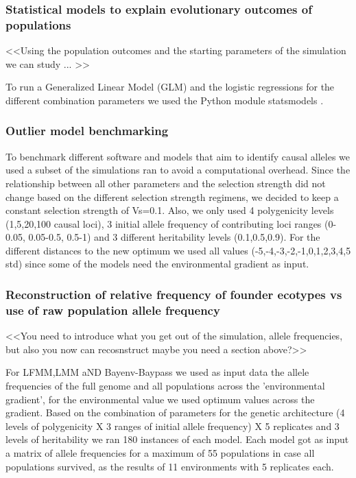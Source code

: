 \documentclass{article}
\begin{document}
\subsubsection{Statistical models to explain evolutionary outcomes of populations}

<<Using the population outcomes and the starting parameters of the simulation we can study ... >>

To run a Generalized Linear Model (GLM) and the logistic regressions for the different combination parameters we used the Python module statsmodels \citep{Seabold2010-ec}. 


\subsubsection{Outlier model benchmarking}

To benchmark different software and models that aim to identify causal alleles we used a subset of the simulations ran to avoid a computational overhead. Since the relationship between all other parameters and the selection strength did not change based on the different selection strength regimens, we decided to keep a constant selection strength of Vs=0.1. Also, we only used 4 polygenicity levels (1,5,20,100 causal loci), 3 initial allele frequency of contributing loci ranges (0-0.05, 0.05-0.5, 0.5-1) and 3 different heritability levels (0.1,0.5,0.9). For the different distances to the new optimum we used all values (-5,-4,-3,-2,-1,0,1,2,3,4,5 std) since some of the models need the environmental gradient as input. 


\subsubsection{Reconstruction of relative frequency of founder ecotypes vs use of raw population allele frequency}  

<<You need to introduce what you get out of the simulation, allele frequencies, but also you now can recosnstruct maybe you need a section above?>>

For LFMM,LMM aND Bayenv-Baypass we used as input data the allele frequencies of the full genome and all populations across the 'environmental gradient', for the environmental value we used optimum values across the gradient. Based on the combination of parameters for the genetic architecture (4 levels of polygenicity X 3 ranges of initial allele frequency) X 5 replicates and 3 levels of heritability we ran 180 instances of each model. Each model got as input a matrix of allele frequencies for a maximum of 55 populations in case all populations survived, as the results of 11 environments with 5 replicates each.  
\end{document}
